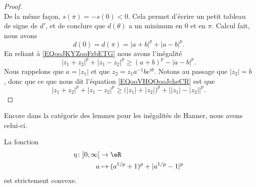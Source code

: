 \begin{proof}
\begin{equation}
	\end{equation}
	De la même façon, \( s(\pi)=-s(0)<0\). Cela permet d'écrire un petit tableau de signe de \( d'\), et de conclure que \( d(\theta)\) a un minimum en \( 0\) et en \( \pi\). Calcul fait, nous avons
	\begin{equation}
		d(0)=d(\pi)=| a+b |^p+| a-b |^p.
	\end{equation}
	En reliant à \eqref{EQooJKYZooFzbETG} nous avons l'inégalité
	\begin{equation}        \label{EQooVHQOooJcheCR}
		| z_1+z_2 |^p+| z_1-z_2 |^p\geq (a+b)^p-| a-b |^p.
	\end{equation}
	Nous rappelons que \( a=| z_1 |\) et que \( z_2=z_1a^{-1}b e^{i\theta}\). Notons au passage que \( | z_2 |=b\), donc que ce que nous dit l'équation \eqref{EQooVHQOooJcheCR} est que
	\begin{equation}
		| z_1+z_2 |^p+| z_1-z_2 |^p\geq \big( | z_1 |+| z_2 | \big)^p+\big| | z_1 |-| z_2 | \big|^p.
	\end{equation}
\end{proof}

Encore dans la catégorie des lemmes pour les inégalités de Hanner, nous avons celui-ci.
\begin{lemma}     \label{LEMooTCNEooADpNai}
	La fonction
	\begin{equation}
		\begin{aligned}
			\eta\colon \mathopen] 0 , \infty \mathclose[ & \to \eR                               \\
			a                                            & \mapsto (a^{1/p}+1)^p+| a^{1/p}-1 |^p
		\end{aligned}
	\end{equation}
	est strictement convexe.
\end{lemma}

